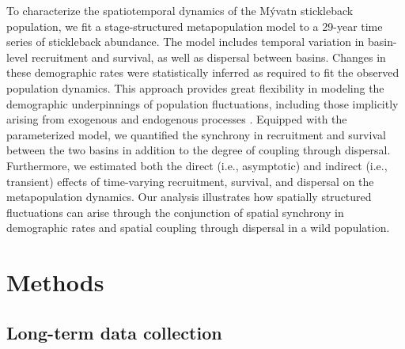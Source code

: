 \documentclass[11pt]{article}
\begin{document}
To characterize the spatiotemporal dynamics of the M\'{y}vatn stickleback population, 
we fit a stage-structured metapopulation model \citep{caswell2001matrix}
to a 29-year time series of stickleback abundance.
The model includes temporal variation in basin-level recruitment and survival, 
as well as dispersal between basins.
Changes in these demographic rates were statistically inferred 
as required to fit the observed population dynamics.
This approach provides great flexibility in modeling the demographic underpinnings of 
population fluctuations,
including those implicitly arising from exogenous and endogenous processes
\citep{zeng1998, ives2012, phillips2022}.
Equipped with the parameterized model, 
we quantified the synchrony in recruitment and survival between the two basins
in addition to the degree of coupling through dispersal.
Furthermore, we estimated both the direct (i.e., asymptotic) 
and indirect (i.e., transient) effects of 
time-varying recruitment, survival, and dispersal
on the metapopulation dynamics.
Our analysis illustrates how spatially structured fluctuations  
can arise through the conjunction of spatial synchrony in demographic rates
and spatial coupling through dispersal in a wild population. 






\section*{Methods} 



\subsection*{Long-term data collection} 
\end{document}
